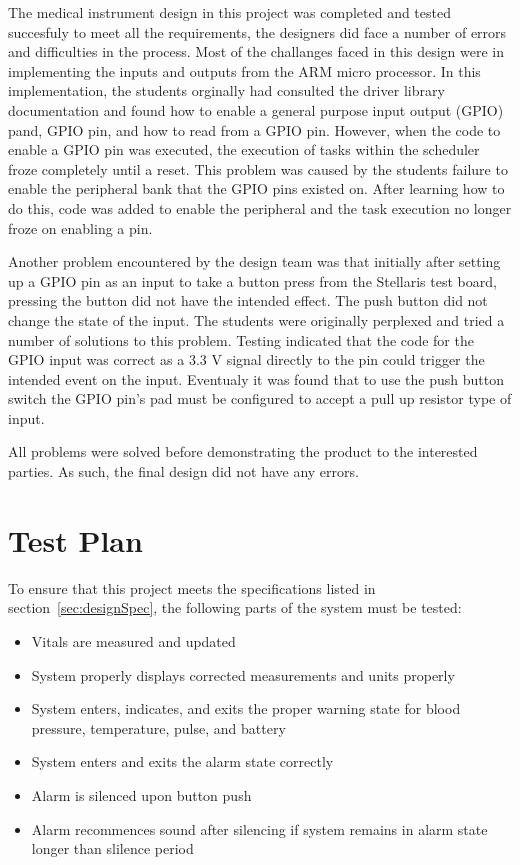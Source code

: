 \documentclass[12pt]{article} %
\begin{document}
The medical instrument design in this project was completed and tested succesfuly to meet all the requirements, the designers did face a number of errors and difficulties in the process. Most of the challanges faced in this design were in implementing the inputs and outputs from the ARM micro processor. In this implementation, the students orginally had consulted the driver library documentation and found how to enable a general purpose input output (GPIO) pand, GPIO pin, and how to read from a GPIO pin. However, when the code to enable a GPIO pin was executed, the execution of tasks within the scheduler froze completely until a reset. This problem was caused by the students failure to enable the peripheral bank that the GPIO pins existed on. After learning how to do this, code was added to enable the peripheral and the task execution no longer froze on enabling a pin.

Another problem encountered by the design team was that initially after setting up a GPIO pin as an input to take a button press from the Stellaris test board, pressing the button did not have the intended effect. The push button did not change the state of the input. The students were originally perplexed and tried a number of solutions to this problem. Testing indicated that the code for the GPIO input was correct as a 3.3 V signal directly to the pin could trigger the intended event on the input. Eventualy it was found that to use the push button switch the GPIO pin's pad must be configured to accept a pull up resistor type of input.

All problems were solved before demonstrating the product to the interested parties. As such, the final design did not have any errors.

\section{Test Plan}

To ensure that this project meets the specifications listed in 
section~\ref{sec:designSpec}, the following parts of the system must be 
tested: 

\begin{itemize}
	\item Vitals are measured and updated
	\item System properly displays corrected measurements and units properly
	\item System enters, indicates, and exits the proper warning state for blood pressure, temperature, pulse, and battery
	\item System enters and exits the alarm state correctly
	\item Alarm is silenced upon button push
	\item Alarm recommences sound after silencing if system remains in alarm state longer than slilence period
\end{itemize}
\end{document}
